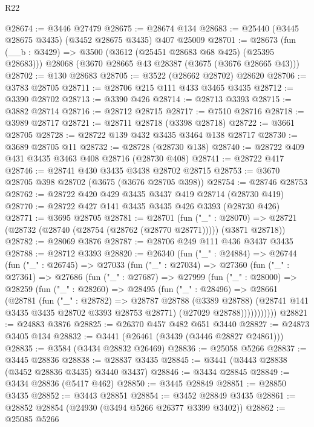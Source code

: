 \begin{lexlean}{R22}
\begin{coremodule}
@28674 := @3446 @27479
@28675 := @28674 @134
@28683 := @25440 (@3445 @28675 @3435) (@3452 @28675 @3435) @407 @25009
@28701 := @28673
    (fun (__b : @3429) => @3500 (@3612 (@25451 @28683 @68 @425) (@25395 @28683)))
    @28068
    (@3670 @28665 @43 @28387 (@3675 (@3676 @28665 @43)))
@28702 := @130 @28683
@28705 := @3522 (@28662 @28702) @28620
@28706 := @3783 @28705
@28711 := @28706 @215 @111 @433 @3465 @3435
@28712 := @3390 @28702
@28713 := @3390 @426
@28714 := @28713 @3393
@28715 := @3882 @28714
@28716 := @28712 @28715
@28717 := @7510 @28716
@28718 := @3989 @28717
@28721 := @28711 @28718 (@3398 @28718)
@28722 := @3661 @28705
@28728 := @28722 @139 @432 @3435 @3464 @138 @28717
@28730 := @3689 @28705 @11
@28732 := @28728 (@28730 @138)
@28740 := @28722 @409 @431 @3435 @3463 @408 @28716 (@28730 @408)
@28741 := @28722 @417
@28746 := @28741 @430 @3435 @3438 @28702 @28715
@28753 := @3670 @28705 @398 @28702 (@3675 (@3676 @28705 @398))
@28754 := @28746 @28753
@28762 := @28722 @420 @429 @3435 @3437 @419 @28714 (@28730 @419)
@28770 := @28722 @427 @141 @3435 @3435 @426 @3393 (@28730 @426)
@28771 := @3695 @28705
@28781 := @28701
    (fun ("_" : @28070) =>
    @28721 (@28732 (@28740 (@28754 (@28762 (@28770 @28771))))) (@3871 @28718))
@28782 := @28069 @3876
@28787 := @28706 @249 @111 @436 @3437 @3435
@28788 := @28712 @3393
@28820 := @26340
    (fun ("_" : @24884) =>
    @26744
      (fun ("_" : @26745) =>
      @27033
        (fun ("_" : @27034) =>
        @27360
          (fun ("_" : @27361) =>
          @27686
            (fun ("_" : @27687) =>
            @27999
              (fun ("_" : @28000) =>
              @28259
                (fun ("_" : @28260) =>
                @28495
                  (fun ("_" : @28496) =>
                  @28661
                    (@28781
                      (fun ("_" : @28782) =>
                      @28787
                        @28788
                        (@3389 @28788)
                        (@28741 @141 @3435 @3435 @28702 @3393 @28753 @28771)
                        (@27029 @28788)))))))))))
@28821 := @24883 @3876
@28825 := @26370 @457 @482 @651 @3440
@28827 := @24873 @3405 @134
@28832 := @3441 (@26461 (@3439 (@3446 @28827 @24861)))
@28835 := @3584 (@3434 @28832 @26469)
@28836 := @25058 @5266
@28837 := @3445 @28836
@28838 := @28837 @3435
@28845 := @3441 (@3443 @28838 (@3452 @28836 @3435) @3440 @3437)
@28846 := @3434 @28845
@28849 := @3434 @28836 (@5417 @462)
@28850 := @3445 @28849
@28851 := @28850 @3435
@28852 := @3443 @28851
@28854 := @3452 @28849 @3435
@28861 := @28852 @28854 (@24930 (@3494 @5266 @26377 @3399 @3402))
@28862 := @25085 @5266

\end{coremodule}
\end{lexlean}
